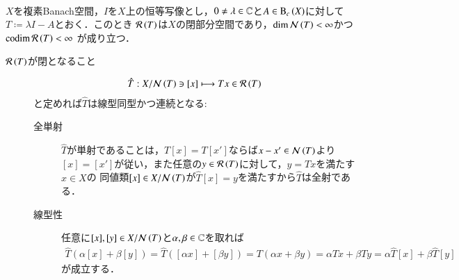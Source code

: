 	\begin{screen}
		\begin{thm}\mbox{}\\
			$X$を複素Banach空間，$I$を$X$上の恒等写像とし，$0 \neq \lambda \in \mathbb{C}$と$A \in \mathrm{B}_c\left(X\right) $に対して
			$T \coloneqq \lambda I - A$とおく．このとき
			$\mathcal{R}\left( T \right)$は$X$の閉部分空間であり，$\operatorname{dim} \mathcal{N}\left( T \right) < \infty$かつ$\operatorname{codim} \mathcal{R}\left( T \right) < \infty$\footnotemark
			が成り立つ．
			\label{thm:Banach_space_compact_operator_kernel_dimension}
		\end{thm}
	\end{screen}
	
	
	\begin{prf}\mbox{}
		\begin{description}
			\item[$\mathcal{R}\left( T \right)$が閉となること]
				\begin{align}
					\hat{T}:X/\mathcal{N}\left( T \right) \ni [x] \longmapsto Tx \in \mathcal{R}\left( T \right)
				\end{align}
				と定めれば$\hat{T}$は線型同型かつ連続となる:
				\begin{description}
					\item[全単射]
						$\hat{T}$が単射であることは，$T[x] = T[x']$ならば$x - x' \in \mathcal{N}\left( T \right)$より
						$[x] = [x']$が従い，また任意の$y \in \mathcal{R}\left( T \right)$に対して，$y = Tx$を満たす$x \in X$の
						同値類$[x] \in X/\mathcal{N}\left( T \right)$が$\hat{T}[x] = y$を満たすから$\hat{T}$は全射である．
					
					\item[線型性]
						任意に$[x],[y] \in X/\mathcal{N}\left( T \right)$と$\alpha,\beta \in \mathbb{C}$を取れば
						\begin{align}
							\hat{T}\left( \alpha[x] + \beta[y] \right)
							= \hat{T}\left( [\alpha x] + [\beta y] \right)
							= T(\alpha x + \beta y)
							= \alpha T x + \beta T y
							= \alpha \hat{T} [x] + \beta \hat{T} [y]
						\end{align}
						が成立する．
						

\end{description}
\end{description}
\end{prf}

